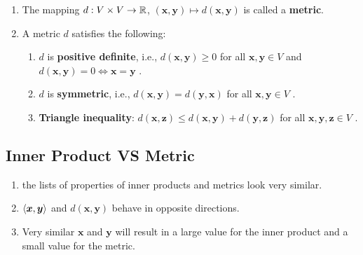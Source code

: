 \begin{enumerate}
    \item
    \begin{definition}[Metric]
        The mapping $d : V \times V \to \mathbb{R}$, $(\bm{x}, \bm{y}) \mapsto d(\bm{x}, \bm{y})$ is called a \textbf{metric}.
        \hfill \cite{mfml/book/mml/Deisenroth-Faisal-Ong}
    \end{definition}

    \item A metric $d$ satisfies the following:
    \hfill \cite{mfml/book/mml/Deisenroth-Faisal-Ong}
    \begin{enumerate}
        \item $d$ is \textbf{positive definite}, i.e., $d(\bm{x}, \bm{y}) \geq 0$ for all $\bm{x}, \bm{y} \in V$ and $d(\bm{x}, \bm{y}) = 0 \Longleftrightarrow \bm{x} = \bm{y}$ .
        \hfill \cite{mfml/book/mml/Deisenroth-Faisal-Ong}

        \item $d$ is \textbf{symmetric}, i.e., $d(\bm{x}, \bm{y}) = d(\bm{y}, \bm{x})$ for all $\bm{x}, \bm{y} \in V$ .
        \hfill \cite{mfml/book/mml/Deisenroth-Faisal-Ong}

        \item \textbf{Triangle inequality}: $d(\bm{x}, \bm{z}) \leq d(\bm{x}, \bm{y}) + d(\bm{y}, \bm{z})$ for all $\bm{x}, \bm{y}, \bm{z} \in V$ .
        \hfill \cite{mfml/book/mml/Deisenroth-Faisal-Ong}
    \end{enumerate}
\end{enumerate}



\subsection{Inner Product VS Metric}

\begin{enumerate}
    \item the lists of properties of inner products and metrics look very similar.
    \hfill \cite{mfml/book/mml/Deisenroth-Faisal-Ong}

    \item $\langle\bm{x}, \bm{y}\rangle$ and $d(\bm{x}, \bm{y})$ behave in opposite directions.
    \hfill \cite{mfml/book/mml/Deisenroth-Faisal-Ong}

    \item Very similar $\bm{x}$ and $\bm{y}$ will result in a large value for the inner product and a small value for the metric.
    \hfill \cite{mfml/book/mml/Deisenroth-Faisal-Ong}
\end{enumerate}




